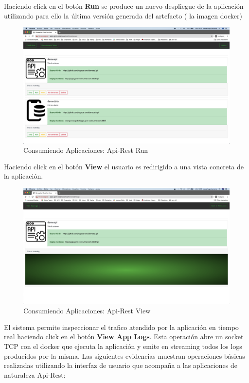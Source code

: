 \documentclass[a4paper,11pt]{book}
\begin{document}
Haciendo click en el botón \textbf{Run} se produce un nuevo despliegue de la aplicación utilizando para ello la última versión generada del artefacto ( la imagen docker) 


\begin{figure}[H]
\centering
\includegraphics[scale=0.2]{imagenes/casouso/1_4.png}
\caption{ Consumiendo Aplicaciones: Api-Rest Run  }
\end{figure}


Haciendo click en el botón \textbf{View} el usuario es redirigido a una vista concreta de la aplicación. 

\begin{figure}[H]
\centering
\includegraphics[scale=0.2]{imagenes/casouso/1_5.png}
\caption{ Consumiendo Aplicaciones: Api-Rest View   }
\end{figure}

El sistema permite inspeccionar el trafico atendido por la aplicación en tiempo real haciendo click en el botón \textbf{View App Logs}. Esta operación abre un socket TCP con el docker que ejecuta la aplicación y emite en streaming todos los logs producidos por la misma. Las siguientes evidencias muestran operaciones básicas realizadas utilizando la interfaz de usuario que acompaña a las aplicaciones de naturaleza Api-Rest:
\end{document}
